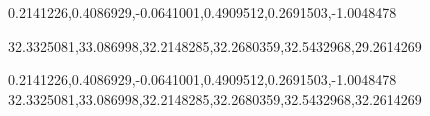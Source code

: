 0.2141226,0.4086929,-0.0641001,0.4909512,0.2691503,-1.0048478

32.3325081,33.086998,32.2148285,32.2680359,32.5432968,29.2614269

0.2141226,0.4086929,-0.0641001,0.4909512,0.2691503,-1.0048478
32.3325081,33.086998,32.2148285,32.2680359,32.5432968,32.2614269